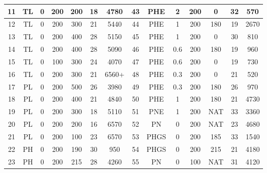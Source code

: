 \begin{table}[p]
\begin{center}
\begin{tabular}{|c|c|c|c|c|c|c||c|c|c|c|c|c|c|}
11   & TL      & 0     & 200        & 200       & 18         & 4780           &   43   & PHE     & 2     & 200        & 0         & 32         & 570         \\ \hline
12   & TL      & 0     & 200        & 300       & 21         & 5440           &   44   & PHE     & 1     & 200        & 180       & 19         & 2670        \\ \hline
13   & TL      & 0     & 200        & 400       & 28         & 5150           &   45   & PHE     & 1     & 200        & 0         & 30         & 810         \\ \hline
14   & TL      & 0     & 200        & 400       & 28         & 5090           &   46   & PHE     & 0.6   & 200        & 180       & 19         & 960         \\ \hline
15   & TL      & 0     & 100        & 300       & 24         & 4070           &   47   & PHE     & 0.6   & 200        & 0         & 19         & 730         \\ \hline
16   & TL      & 0     & 200        & 300       & 21         & 6560+          &   48   & PHE     & 0.3   & 200        & 0         & 21         & 520         \\ \hline
17   & PL      & 0     & 200        & 500       & 26         & 3980           &   49   & PHE     & 0.3   & 200        & 180       & 26         & 970         \\ \hline
18   & PL      & 0     & 200        & 400       & 21         & 4840           &   50   & PHE     & 1     & 200        & 180       & 21         & 4730        \\ \hline
19   & PL      & 0     & 200        & 300       & 18         & 5110           &   51   & PNE     & 1     & 200        & NAT       & 33         & 3360        \\ \hline
20   & PL      & 0     & 200        & 200       & 16         & 6570           &   52   & PN      & 0     & 200        & NAT       & 23         & 4680        \\ \hline
21   & PL      & 0     & 200        & 100       & 23         & 6570           &   53   & PHGS    & 0     & 200        & 185       & 33         & 1540        \\ \hline
22   & PH      & 0     & 200        & 190       & 30         & 950            &   54   & PHGS    & 0     & 200        & 215       & 21         & 4180        \\ \hline
23   & PH      & 0     & 200        & 215       & 28         & 4260           &   55   & PN      & 0     & 100        & NAT       & 31         & 4120        \\ \hline

\end{tabular}
\end{center}
\end{table}
